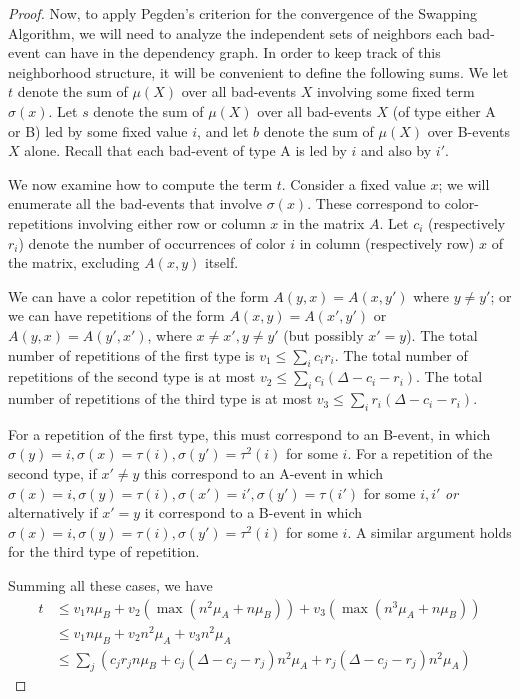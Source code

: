 \begin{proof}
Now, to apply Pegden's criterion \cite{pegden} for the convergence of the Swapping Algorithm, we will need to analyze the independent sets of neighbors each bad-event can have in the dependency graph. In order to keep track of this neighborhood structure, it will be convenient to define the following sums. We let $t$ denote the sum of $\mu(X)$ over all bad-events $X$ involving some fixed term $\sigma(x)$. Let $s$ denote the sum of $\mu(X)$ over all bad-events $X$ (of type either A or B) led by some fixed value $i$, and let $b$ denote the sum of $\mu(X)$ over B-events $X$ alone. Recall that each bad-event of type A is led by $i$ and also by $i'$. 

We now examine how to compute the term $t$. Consider a fixed value $x$; we will enumerate all the bad-events that involve $\sigma(x)$. These correspond to color-repetitions involving either row or column $x$ in the matrix $A$. Let $c_i$ (respectively $r_i$) denote the number of occurrences of color $i$ in column (respectively row) $x$ of the matrix, excluding $A(x,y)$ itself. 

We can have a color repetition of the form $A(y,x) = A(x,y')$ where $y \neq y'$; or we can have repetitions of the form $A(x,y) = A(x', y')$ or $A(y, x) = A(y', x')$, where $x \neq x', y \neq y'$ (but possibly $x' = y$). The total number of repetitions of the first type is $v_1 \leq \sum_i c_i r_i$. The total number of repetitions of the  second type is at most $v_2 \leq \sum_i c_i (\Delta - c_i - r_i)$. The total number of repetitions of the third type is at most $v_3 \leq \sum_i r_i (\Delta - c_i - r_i)$.

For a repetition of the first type, this must correspond to an B-event, in which $\sigma(y) = i, \sigma(x) = \tau(i), \sigma(y') = \tau^2(i)$ for some $i$. For a repetition of the second type, if $x' \neq y$ this correspond to an A-event in which $\sigma(x) = i, \sigma(y) = \tau(i), \sigma(x') = i', \sigma(y') = \tau(i')$ for some $i, i'$ \emph{or} alternatively if $x' = y$ it correspond to a B-event in which $\sigma(x) = i, \sigma(y) = \tau(i), \sigma(y') = \tau^2(i)$ for some $i$. A similar argument holds for the third type of repetition.

Summing all these cases, we have 
{\allowdisplaybreaks
\begin{align*}
t &\leq v_1 n \mu_B + v_2 (\max(n^2 \mu_A + n \mu_B)) + v_3 (\max(n^3 \mu_A + n \mu_B)) \\
&\leq v_1 n \mu_B + v_2 n^2 \mu_A + v_3 n^2 \mu_A  \\
&\leq \sum_j (c_j r_j n \mu_B + c_j (\Delta - c_j - r_j) n^2 \mu_A + r_j (\Delta - c_j - r_j) n^2 \mu_A)
\end{align*}
}


\end{proof}
